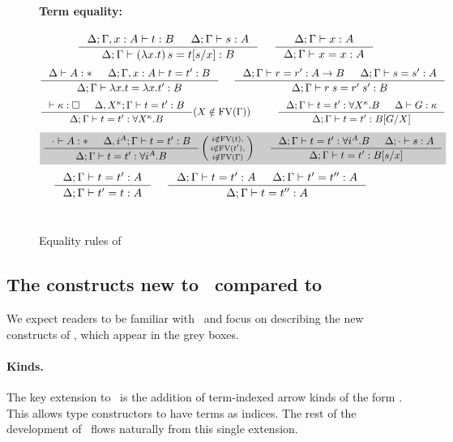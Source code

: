\begin{figure*}
\paragraph{Term equality:} 
$ \qquad
 ~~~~
   \inference{\Delta;\Gamma,x:A |- t:B & \Delta;\Gamma |- s:A}
             {\Delta;\Gamma |- (\lambda x.t)\,s=t[s/x] : B}
 ~~~~
   \inference{\Delta;\Gamma |- x:A}{\Delta;\Gamma |- x=x:A}
$
\[ \inference{\Delta |- A:* & \Delta;\Gamma,x:A |- t=t':B}
             {\Delta;\Gamma |- \lambda x.t = \lambda x.t':B}
 ~~~~
   \inference{\Delta;\Gamma |- r=r':A-> B & \Delta;\Gamma |- s=s':A}
             {\Delta;\Gamma |- r\;s=r'\;s':B}
\]
\[ \inference{|- \kappa:\square & \Delta, X^\kappa;\Gamma |- t=t' : B}
             {\Delta;\Gamma |- t=t' : \forall X^\kappa.B}
	     (X\notin\FV(\Gamma))
 ~~~~ ~~~~
   \inference{ \Delta;\Gamma |- t=t' : \forall X^\kappa.B
             & \Delta |- G:\kappa }
             {\Delta;\Gamma |- t=t' : B[G/X]}
\]
\[ \newFi{
   \inference{\cdot |- A:* & \Delta, i^A;\Gamma |- t=t' : B}
             {\Delta;\Gamma |- t=t' : \forall i^A.B}
   \left(\begin{smallmatrix}
		i\notin\FV(t),\\
		i\notin\FV(t'),\\
		i\notin\FV(\Gamma)\end{smallmatrix}\right)
 ~~~~
   \inference{ \Delta;\Gamma |- t=t' : \forall i^A.B
             & \Delta;\cdot |- s:A}
             {\Delta;\Gamma |- t=t' : B[s/x]} }
\]
\[ \inference{\Delta;\Gamma |- t=t':A}{\Delta;\Gamma |- t'=t:A}
 ~~~~
   \inference{\Delta;\Gamma |- t=t':A & \Delta;\Gamma |- t'=t'':A}
             {\Delta;\Gamma |- t=t'':A}
\]
~\\
\caption{Equality rules of \Fi}
\label{fig:eqFi}
\end{figure*}

\subsection{The constructs new to \Fi\ compared to \Fw} \label{ssec:newFi}
We expect readers to be familiar with \Fw\
and focus on describing the new constructs of \Fi, which appear in the grey boxes.


\paragraph{Kinds.}
The key extension to \Fw\ is the addition of term-indexed arrow kinds of
the form \newFi{A -> \kappa}. This allows type constructors to have terms
as indices. The rest of the development of \Fi\ flows naturally from
this single extension.

